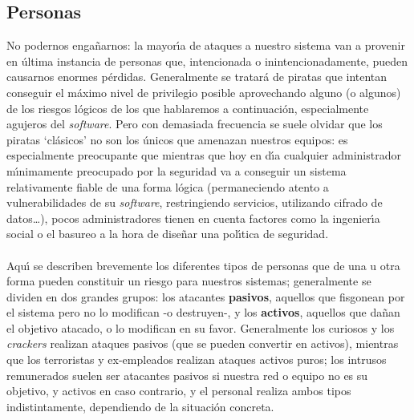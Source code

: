 \subsection{Personas}
No podernos enga\~narnos: la mayor\'{\i}a de ataques a nuestro sistema van a
provenir en \'ultima ins\-tan\-cia de personas que, intencionada o 
inintencionadamente, pueden causarnos enormes p\'erdidas. Generalmente se 
tratar\'a de piratas que intentan conseguir el m\'aximo nivel de privilegio 
posible aprovechando alguno (o algunos) de los riesgos l\'ogicos de los que 
hablaremos a continuaci\'on, especialmente agujeros 
del {\it software}. Pero con demasiada frecuencia se suele olvidar que los 
piratas `cl\'asicos' no son los \'unicos que amenazan nuestros equipos:
es especialmente preocupante que mientras que hoy en d\'{\i}a cualquier 
administrador m\'{\i}nimamente preocupado por la seguridad va a conseguir un 
sistema relativamente fiable de una forma l\'ogica (permaneciendo atento a
vulnerabilidades de su {\it software}, restringiendo servicios, utilizando
cifrado de datos\ldots), pocos administradores tienen en cuenta factores como
la ingenier\'{\i}a social o el basureo a la hora de dise\~nar una pol\'{\i}tica
de seguridad.\\ 
\\Aqu\'{\i} se describen brevemente los diferentes tipos de personas
que de una u otra forma pueden constituir un riesgo para nuestros sistemas; 
generalmente se dividen en dos grandes grupos: los atacantes {\bf pasivos}, 
aquellos que fisgonean por el sistema pero no lo modifican -o destruyen-, y los
{\bf activos}, aquellos que da\~nan el objetivo atacado, o lo
modifican en su favor. Generalmente los curiosos y los {\it crackers} realizan
ataques pasivos (que se pueden convertir en activos), mientras que los 
terroristas y ex-empleados realizan ataques activos puros; los intrusos 
remunerados suelen ser atacantes pasivos si nuestra red o equipo no es su 
objetivo, y activos en caso contrario, y el personal realiza ambos tipos 
indistintamente, dependiendo de la situaci\'on concreta.\\
